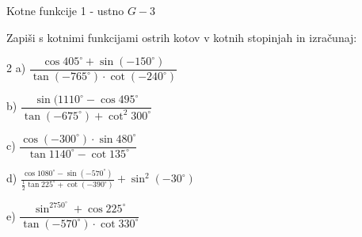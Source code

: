 \documentclass[a4paper,12pt]{letter}
\renewcommand{\headrulewidth}{3pt}
\renewcommand{\headrulewidth}{0.3pt}
\begin{document}
\pagestyle{fancy}
\renewcommand\headrulewidth{0pt}
\lhead{}\chead{}\rhead{}
\rfoot{\vspace*{-2\baselineskip}}


\renewcommand{\vec}{\overrightarrow}


\everymath{\displaystyle}
\begin{minipage}{20cm}
\begin{bclogo}[couleur=brown!40,
  arrondi=0,ombre=true, couleurOmbre=gray!50,
logo =\bcplume,
  noborder=true]
{\textrm{{\Large{Kotne funkcije 1 - ustno} \Huge{}
%
%
\large{} \hfill $G-3$}}}
\end{bclogo}
\end{minipage}

\begin{naloga}
Zapiši s kotnimi funkcijami ostrih kotov v kotnih stopinjah in izračunaj:
\begin{multicols}{2}
a) $
\dfrac{\cos 405^\circ + \sin(-150^\circ)}{\tan(-765^\circ) \cdot \cot(-240^\circ)}$

b) $
\dfrac{\sin(1110^\circ - \cos495^\circ}{\tan(-675^\circ) + \cot^2 300^\circ}
$

c) $
\dfrac{\cos(-300^\circ) \cdot \sin480^\circ}{\tan1140^\circ - \cot135^\circ}
$

d) $
\frac{\cos1080^\circ - \sin(-570^\circ)}{\frac{1}{2}\tan225^\circ + \cot(-390^\circ)}+\sin^2(-30^{\circ})
$ 

e) $
\dfrac{\sin^2750^\circ + \cos225^\circ}{\tan(-570^\circ) \cdot \cot330^\circ}
$
\end{multicols}
\end{naloga}
\end{document}
